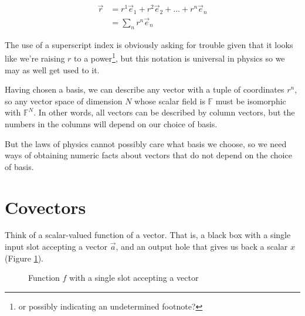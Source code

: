 \begin{equation}
\begin{split}
\vec{r} &= r^1 \vec{e}_1 + r^2 \vec{e}_2 + ... + r^n \vec{e}_n \\
        &= \sum_n r^n \vec{e}_n
\end{split}
\end{equation}

The use of a superscript index is obviously asking for trouble given that it looks like we're raising $r$ to a power\footnote{or possibly indicating an undetermined footnote?}, but this notation is universal in physics so we may as well get used to it.

Having chosen a basis, we can describe any vector with a tuple of coordinates $r^n$, so any vector space of dimension $N$ whose scalar field is $\mathbb{F}$ must be isomorphic with $\mathbb{F}^N$. In other words, all vectors can be described by column vectors, but the numbers in the columns will depend on our choice of basis.

But the laws of physics cannot possibly care what basis we choose, so we need ways of obtaining numeric facts about vectors that do not depend on the choice of basis.

\section{Covectors} \label{covector}

Think of a scalar-valued function of a vector. That is, a black box with a single input slot accepting a vector $\vec{a}$, and an output hole that gives us back a scalar $x$ (Figure \ref{fig:1-slot-box}).

\begin{figure}[h]
    \centering
    \caption{Function $f$ with a single slot accepting a vector} \label{fig:1-slot-box}
\end{figure}

